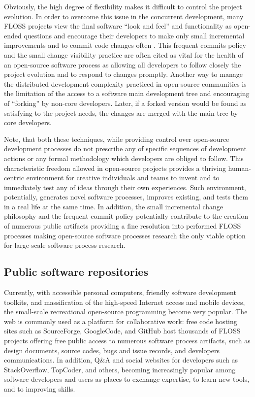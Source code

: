 Obviously, the high degree of flexibility makes it difficult to control the project evolution. 
In order to overcome this issue in the concurrent development, many FLOSS projects view the final 
software ``look and feel'' and functionality as open-ended questions and encourage their developers to 
make only small incremental improvements and to commit code changes often 
\cite{so-checkin} \cite{git-best-practices1}. This frequent commits policy and the small change visibility 
practice are often cited as vital for the health of an open-source software process as allowing all developers 
to follow closely the project evolution and to respond to changes promptly.
Another way to manage the distributed development complexity practiced in open-source communities is the 
limitation of the access to a software main development tree and encouraging of ``forking'' by non-core developers. 
Later, if a forked version would be found as satisfying to the project needs, the changes are merged with the 
main tree by core developers.

Note, that both these techniques, while providing control over open-source development processes do not prescribe 
any of specific sequences of development actions or any formal methodology which developers are obliged to follow.
This characteristic freedom allowed in open-source projects provides a thriving human-centric environment for 
creative individuals and teams to invent and to immediately test any of ideas through their own experiences. 
Such environment, potentially, generates novel software processes, improves existing, and tests them in a real life
at the same time. 
In addition, the small incremental change philosophy and the frequent commit policy potentially contribute to the 
creation of numerous public artifacts providing a fine resolution into performed FLOSS processes making open-source 
software processes research the only viable option for large-scale software process research.

\subsection{Public software repositories}
Currently, with accessible personal computers, friendly software development toolkits, and massification of 
the high-speed Internet access and mobile devices, the small-scale recreational open-source programming 
become very popular. 
The web is commonly used as a platform for collaborative work: free code hosting sites such as SourceForge, 
GoogleCode, and GitHub host thousands of FLOSS projects offering free public access to numerous software 
process artifacts, such as design documents, source codes, bugs and issue records, and developers communications.
In addition, Q\&A and social websites for developers such as StackOverflow, TopCoder, and others, becoming 
increasingly popular among software developers and users as places to exchange expertise, to learn new tools, 
and to improving skills.

